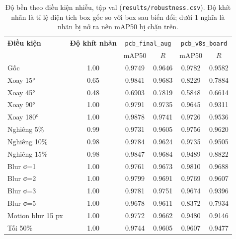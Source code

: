 \begin{table}[H]
\centering
\small
\caption{Độ bền theo điều kiện nhiễu, tập val (\texttt{results/robustness.csv}). Độ khít nhãn là tỉ lệ diện tích box gốc so với box sau biến đổi; dưới 1 nghĩa là nhãn bị nở ra nên mAP50 bị chặn trên.}\label{tab:chiunhieu_val}
\begin{tabular}{l|c|cc|cc}
\toprule
\textbf{Điều kiện} & \textbf{Độ khít nhãn} & \multicolumn{2}{c}{\texttt{pcb\_final\_aug}} & \multicolumn{2}{c}{\texttt{pcb\_v8s\_board}} \\
 &  & mAP50 & $R$ & mAP50 & $R$ \\ \midrule
Gốc & 1.00 & 0.9749 & 0.9646 & 0.9782 & 0.9582 \\
Xoay 15° & 0.65 & 0.9841 & 0.9683 & 0.8229 & 0.7884 \\
Xoay 45° & 0.48 & 0.6903 & 0.7819 & 0.5848 & 0.6614 \\
Xoay 90° & 1.00 & 0.9791 & 0.9735 & 0.9645 & 0.9311 \\
Xoay 180° & 1.00 & 0.9878 & 0.9741 & 0.9726 & 0.9536 \\
Nghiêng 5\% & 0.99 & 0.9731 & 0.9605 & 0.9756 & 0.9620 \\
Nghiêng 10\% & 0.98 & 0.9784 & 0.9624 & 0.9735 & 0.9505 \\
Nghiêng 15\% & 0.98 & 0.9847 & 0.9684 & 0.9489 & 0.8822 \\
Blur σ=1 & 1.00 & 0.9761 & 0.9673 & 0.9810 & 0.9688 \\
Blur σ=2 & 1.00 & 0.9799 & 0.9691 & 0.9769 & 0.9607 \\
Blur σ=3 & 1.00 & 0.9781 & 0.9751 & 0.9674 & 0.9396 \\
Blur σ=5 & 1.00 & 0.9678 & 0.9611 & 0.8372 & 0.7934 \\
Motion blur 15 px & 1.00 & 0.9772 & 0.9662 & 0.9480 & 0.9146 \\
Tối 50\% & 1.00 & 0.9744 & 0.9605 & 0.9607 & 0.9477 \\
\bottomrule
\end{tabular}
\end{table}
